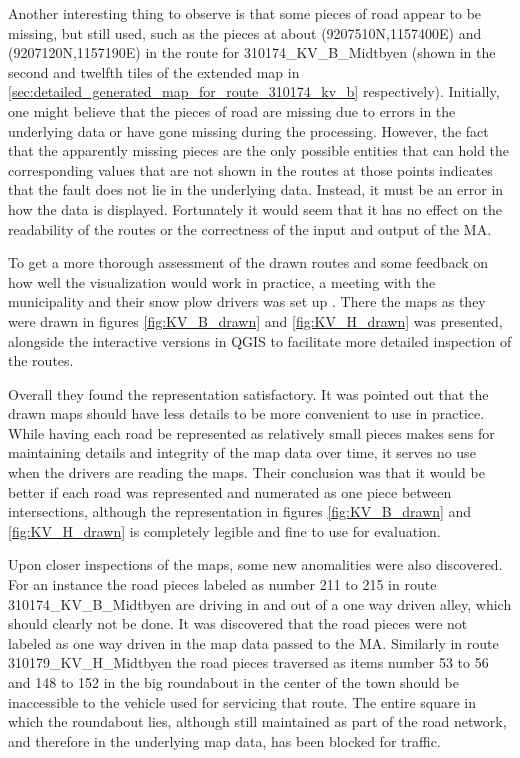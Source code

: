 Another interesting thing to observe is that some pieces of road appear to be missing, but still used, such as the pieces at about (9207510\degree N,1157400\degree E) and (9207120\degree N,1157190\degree E) in the route for 310174\_KV\_B\_Midtbyen (shown in the second and twelfth tiles of the extended map in \ref{sec:detailed_generated_map_for_route_310174_kv_b} respectively). Initially, one might believe that the pieces of road are missing due to errors in the underlying data or have gone missing during the processing. However, the fact that the apparently missing pieces are the only possible entities that can hold the corresponding values that are not shown in the routes at those points indicates that the fault does not lie in the underlying data. Instead, it must be an error in how the data is displayed. Fortunately it would seem that it has no effect on the readability of the routes or the correctness of the input and output of the MA.

To get a more thorough assessment of the drawn routes and some feedback on how well the visualization would work in practice, a meeting with the municipality and their snow plow drivers was set up \citep{meetingToAssesTheGeneratedRoutes}. There the maps as they were drawn in figures \ref{fig:KV_B_drawn} and \ref{fig:KV_H_drawn} was presented, alongside the interactive versions in QGIS to facilitate more detailed inspection of the routes.

Overall they found the representation satisfactory. It was pointed out that the drawn maps should have less details to be more convenient to use in practice. While having each road be represented as relatively small pieces makes sens for maintaining details and integrity of the map data over time, it serves no use when the drivers are reading the maps. Their conclusion was that it would be better if each road was represented and numerated as one piece between intersections, although the representation in figures \ref{fig:KV_B_drawn} and \ref{fig:KV_H_drawn} is completely legible and fine to use for evaluation.

Upon closer inspections of the maps, some new anomalities were also discovered. For an instance the road pieces labeled as number 211 to 215 in route 310174\_KV\_B\_Midtbyen are driving in and out of a one way driven alley, which should clearly not be done. It was discovered that the road pieces were not labeled as one way driven in the map data passed to the MA. Similarly in route 310179\_KV\_H\_Midtbyen the road pieces traversed as items number 53 to 56 and 148 to 152 in the big roundabout in the center of the town should be inaccessible to the vehicle used for servicing that route. The entire square in which the roundabout lies, although still maintained as part of the road network, and therefore in the underlying map data, has been blocked for traffic.


